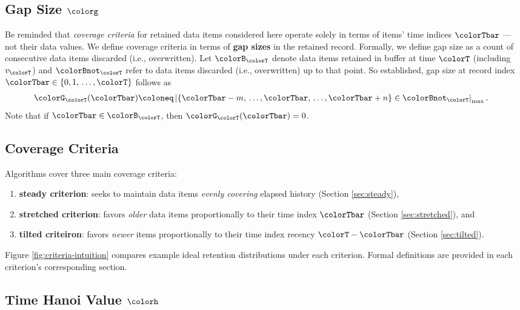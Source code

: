 \subsection{Gap Size $\colorg$}
\label{sec:notation-gapsize}

Be reminded that \textit{coverage criteria} for retained data items considered here operate solely in terms of items' time indices $\colorTbar$ --- not their data values.
We define coverage criteria in terms of \textbf{gap sizes} in the retained record.
Formally, we define gap size as a count of consecutive data items discarded (i.e., overwritten).
Let $\colorB_{\colorT}$ denote data items retained in buffer at time $\colorT$ (including $v_{\colorT}$) and $\colorBnot_{\colorT}$ refer to data items discarded (i.e., overwritten) up to that point.
So established, gap size at record index $\colorTbar \in \{0,1,\,\ldots,\colorT\}$ follows as
\begin{align}
\colorG_{\colorT}(\colorTbar)
&\coloneq
\left| \{\colorTbar - m, \,\ldots, \colorTbar, \,\ldots, \colorTbar+n\} \in \colorBnot_{\colorT} \right|_\mathrm{max}.
\label{eqn:gap-size-defn}
\end{align}
Note that if $\colorTbar \in \colorB_{\colorT}$, then $\colorG_{\colorT}(\colorTbar) = 0$.

\subsection{Coverage Criteria}
\label{sec:notation-coverage}

Algorithms cover three main coverage criteria:
\begin{enumerate}
\item \textbf{steady criterion}: seeks to maintain data items \textit{evenly covering} elapsed history (Section \ref{sec:steady}),
\item \textbf{stretched criterion}: favors \textit{older} data items proportionally to their time index $\colorTbar$ (Section \ref{sec:stretched}), and
\item \textbf{tilted criteiron}: favors \textit{newer} items proportionally to their time index recency $\colorT - \colorTbar$ (Section \ref{sec:tilted}).
\end{enumerate}
Figure \ref{fig:criteria-intuition} compares example ideal retention distributions under each criterion.
Formal definitions are provided in each criterion's corresponding section.

\subsection{Time Hanoi Value $\colorh$}
\label{sec:notation-hanoi}


